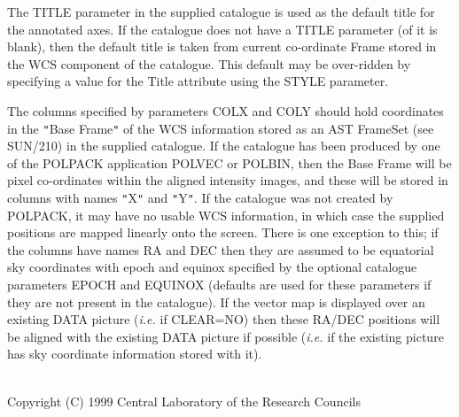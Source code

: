 \documentclass[twoside,11pt]{article}
\newcommand{\htmlref}[2]{#1}
\newcommand{\xref}[3]{#1}
\renewcommand{\_}{\texttt{\symbol{95}}}
\newcommand{\sstdiytopic}[2]{\item[{\hspace{-0.35em}#1\hspace{-0.35em}:}]
\mbox{} \\[1.3ex] #2}
\newcommand{\sstitem}{\item}
\newcommand{\sstdiytopic}[2]{\item[{#1}] #2 }
\newcommand{\sstitem}{\item}
\begin{document}
{{{         \sstitem
         The TITLE parameter in the supplied catalogue is used as the default
         title for the annotated axes. If the catalogue does not have a TITLE
         parameter (of it is blank), then the default title is taken from current
         co-ordinate Frame stored in the WCS component of the catalogue. This
         default may be over-ridden by specifying a value for the Title
         attribute using the STYLE parameter.

         \sstitem
         The columns specified by parameters COLX and COLY should hold
         coordinates in the {\tt "}Base Frame{\tt "} of the WCS information stored as
         an AST FrameSet (see \xref{SUN/210}{sun210}{}) in the supplied catalogue. If the
         catalogue has been produced by one of the POLPACK application \htmlref{POLVEC}{POLVEC}
         or \htmlref{POLBIN}{POLBIN}, then the Base Frame will be pixel co-ordinates within the
         aligned intensity images, and these will be stored in columns with
         names {\tt "}X{\tt "} and {\tt "}Y{\tt "}. If the catalogue was not created by POLPACK, it
         may have no usable WCS information, in which case the supplied
         positions are mapped linearly onto the screen. There is one
         exception to this; if the columns have names RA and DEC then they
         are assumed to be equatorial sky coordinates with epoch and equinox
         specified by the optional catalogue parameters EPOCH and EQUINOX
         (defaults are used for these parameters if they are not present in the
         catalogue). If the vector map is displayed over an existing DATA
         picture (\emph{i.e.} if CLEAR=NO) then these RA/DEC positions will be aligned
         with the existing DATA picture if possible (\emph{i.e.} if the existing
         picture has sky coordinate information stored with it).
      }
   }
   \sstdiytopic{
      Copyright
   }{
      Copyright (C) 1999 Central Laboratory of the Research Councils
   }
}
\end{document}
